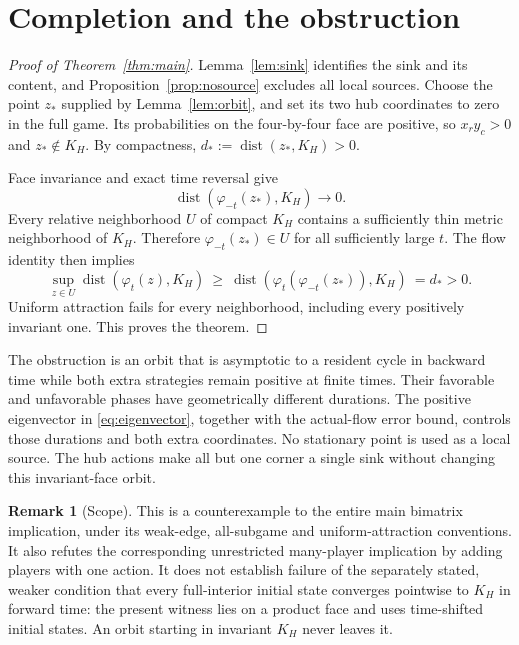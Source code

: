 \documentclass[11pt,a4paper]{article}
\numberwithin{equation}{section}
\theoremstyle{definition}
\newtheorem{remark}[theorem]{Remark}
\DeclareMathOperator{\dist}{dist}
\begin{document}
\section{Completion and the obstruction}\label{sec:completion}

\begin{proof}[Proof of Theorem~\ref{thm:main}]
Lemma~\ref{lem:sink} identifies the sink and its content, and
Proposition~\ref{prop:nosource} excludes all local sources.
Choose the point \(z_*\) supplied by Lemma~\ref{lem:orbit}, and set
its two hub coordinates to zero in the full game. Its probabilities
on the four-by-four face are positive, so \(x_r y_c>0\) and
\(z_*\notin K_H\). By compactness,
\(d_*:=\dist(z_*,K_H)>0\).

Face invariance and exact time reversal give
\[
 \dist(\varphi_{-t}(z_*),K_H)\longrightarrow0.
\]
Every relative neighborhood \(U\) of compact \(K_H\) contains a
sufficiently thin metric neighborhood of \(K_H\). Therefore
\(\varphi_{-t}(z_*)\in U\) for all sufficiently large \(t\).
The flow identity then implies
\[
 \sup_{z\in U}\dist(\varphi_t(z),K_H)
 \ \ge\ \dist(\varphi_t(\varphi_{-t}(z_*)),K_H)
 \ =d_*>0.
\]
Uniform attraction fails for every neighborhood, including every
positively invariant one. This proves the theorem.
\end{proof}

The obstruction is an orbit that is asymptotic to a resident cycle in
backward time while both extra strategies remain positive at finite
times. Their favorable and unfavorable phases have geometrically
different durations. The positive eigenvector in
\eqref{eq:eigenvector}, together with the actual-flow error bound,
controls those durations and both extra coordinates. No stationary
point is used as a local source. The hub actions make all but one
corner a single sink without changing this invariant-face orbit.

\begin{remark}[Scope]
This is a counterexample to the entire main bimatrix implication,
under its weak-edge, all-subgame and uniform-attraction conventions.
It also refutes the corresponding unrestricted many-player implication
by adding players with one action. It does not establish failure of
the separately stated, weaker condition that every full-interior
initial state converges pointwise to \(K_H\) in forward time: the
present witness lies on a product face and uses time-shifted initial
states. An orbit starting in invariant \(K_H\) never leaves it.
\end{remark}
\end{document}
